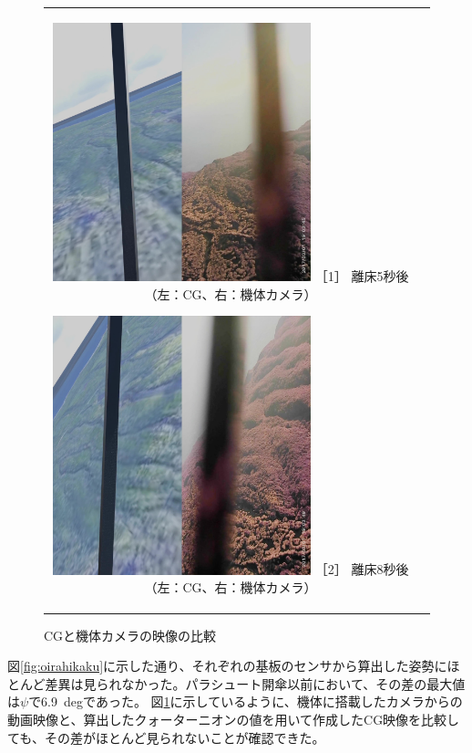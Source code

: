 \documentclass[a4paper,11pt,uplatex]{jsarticle}
\begin{document}
\begin{figure}[H]
	\begin{tabular}{cc}
		\begin{minipage}{.48\textwidth}
			\centering
			\includegraphics[width=75mm]{pic_sim/compare_5.jpg}
			\hspace{16mm} {\small［1］ 離床5秒後（左：CG、右：機体カメラ）}
		\end{minipage}
		\begin{minipage}{.48\textwidth}
			\centering
			\includegraphics[width=75mm]{pic_sim/compare_8.jpg}
			\hspace{16mm} {\small［2］ 離床8秒後（左：CG、右：機体カメラ）}
		\end{minipage}
	\end{tabular}
	\centering
	\caption{CGと機体カメラの映像の比較}
	\label{fig:dougahikaku}
\end{figure}

図\ref{fig:oirahikaku}に示した通り、それぞれの基板のセンサから算出した姿勢にほとんど差異は見られなかった。パラシュート開傘以前において、その差の最大値は$\psi$で\SI{6.9}{deg}であった。
図\ref{fig:dougahikaku}に示しているように、機体に搭載したカメラからの動画映像と、算出したクォーターニオンの値を用いて作成したCG映像を比較しても、その差がほとんど見られないことが確認できた。
\end{document}
